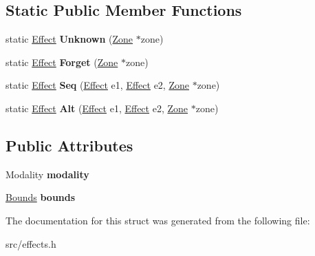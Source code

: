 \subsection*{Static Public Member Functions}
\begin{DoxyCompactItemize}
\item 
\hypertarget{structv8_1_1internal_1_1_effect_a11668ede7c29f4ad9d20bee2825c914f}{}static \hyperlink{structv8_1_1internal_1_1_effect}{Effect} {\bfseries Unknown} (\hyperlink{classv8_1_1internal_1_1_zone}{Zone} $\ast$zone)\label{structv8_1_1internal_1_1_effect_a11668ede7c29f4ad9d20bee2825c914f}

\item 
\hypertarget{structv8_1_1internal_1_1_effect_ada297ee6768879616eef3714bc6d4259}{}static \hyperlink{structv8_1_1internal_1_1_effect}{Effect} {\bfseries Forget} (\hyperlink{classv8_1_1internal_1_1_zone}{Zone} $\ast$zone)\label{structv8_1_1internal_1_1_effect_ada297ee6768879616eef3714bc6d4259}

\item 
\hypertarget{structv8_1_1internal_1_1_effect_af468c95d1e4a6e1b51322e0fcf281cd4}{}static \hyperlink{structv8_1_1internal_1_1_effect}{Effect} {\bfseries Seq} (\hyperlink{structv8_1_1internal_1_1_effect}{Effect} e1, \hyperlink{structv8_1_1internal_1_1_effect}{Effect} e2, \hyperlink{classv8_1_1internal_1_1_zone}{Zone} $\ast$zone)\label{structv8_1_1internal_1_1_effect_af468c95d1e4a6e1b51322e0fcf281cd4}

\item 
\hypertarget{structv8_1_1internal_1_1_effect_a92fbb9d3d35cd46d45e9541e0c1ba3cf}{}static \hyperlink{structv8_1_1internal_1_1_effect}{Effect} {\bfseries Alt} (\hyperlink{structv8_1_1internal_1_1_effect}{Effect} e1, \hyperlink{structv8_1_1internal_1_1_effect}{Effect} e2, \hyperlink{classv8_1_1internal_1_1_zone}{Zone} $\ast$zone)\label{structv8_1_1internal_1_1_effect_a92fbb9d3d35cd46d45e9541e0c1ba3cf}

\end{DoxyCompactItemize}
\subsection*{Public Attributes}
\begin{DoxyCompactItemize}
\item 
\hypertarget{structv8_1_1internal_1_1_effect_a28b51f74c7f1ed7dbe7219474d3406d5}{}Modality {\bfseries modality}\label{structv8_1_1internal_1_1_effect_a28b51f74c7f1ed7dbe7219474d3406d5}

\item 
\hypertarget{structv8_1_1internal_1_1_effect_a3cc31d9ea8b9f00de94ca13068ecdf0a}{}\hyperlink{structv8_1_1internal_1_1_bounds_impl}{Bounds} {\bfseries bounds}\label{structv8_1_1internal_1_1_effect_a3cc31d9ea8b9f00de94ca13068ecdf0a}

\end{DoxyCompactItemize}


The documentation for this struct was generated from the following file\+:\begin{DoxyCompactItemize}
\item 
src/effects.\+h\end{DoxyCompactItemize}
